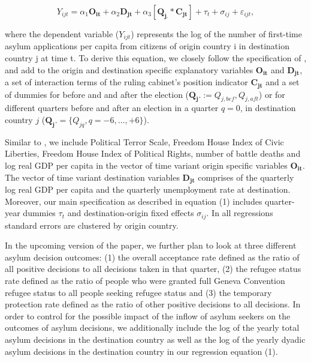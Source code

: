 \documentclass[a4paper,12pt]{article}
\begin{document}
\begin{equation}
Y_{ijt} =\alpha_1 \mathbf{O_{it}} + \alpha_2 \mathbf{D_{jt}} + \alpha_3 [\mathbf{Q_{j.}} *  \mathbf{C_{jt}}] + \tau_t + \sigma_{ij} +  \varepsilon_{ijt},
\end{equation}

where the dependent variable ($Y_{ijt}$) represents the log of the number of first-time asylum applications per capita from citizens of origin country i in destination country j at time t. To derive this equation, we closely follow the specification of \cite{hatton2016}, and add to the origin and destination specific explanatory variables $\mathbf{O_{it}}$ and $\mathbf{D_{jt}}$, a set of interaction terms of the ruling cabinet's position indicator $\mathbf{C_{jt}}$
 and  a set of dummies for before and and after the election ($\mathbf{Q_j.} := Q_{j,bef},  Q_{j,aft}$) or for different quarters before and after an election in a quarter $q=0$, in destination country $j$ ($\mathbf{Q_j.} =\{Q_{jq}, q = -6, \ldots, +6\}$).
 
  Similar to \cite{hatton2016}, we include Political Terror Scale, Freedom House Index of Civic Liberties, Freedom House Index of  Political Rights, number of battle deaths and log real GDP per capita in the vector of time variant origin specific variables $\mathbf{O_{it}}$. The vector of time variant destination variables $\mathbf{D_{jt}}$ comprises of the quarterly log real GDP per capita and the quarterly unemployment rate at destination. Moreover, our main specification as described in equation (1) includes quarter-year dummies $\tau_t$ and destination-origin fixed effects $\sigma_{ij}$. In all regressions standard errors are clustered by origin country.
 
 In the upcoming version of the paper, we further plan to look at three different asylum decision outcomes: (1) the overall acceptance rate defined as the ratio of all positive decisions to all decisions taken in that quarter, (2) the refugee status rate defined as the ratio of people who were granted full Geneva Convention refugee status to all people seeking refugee status and (3) the temporary protection rate defined as the ratio of other positive decisions to all decisions.  In order to control for the possible impact of the inflow of asylum seekers on the outcomes of asylum decisions, we additionally include  the log of the yearly total asylum decisions in the destination country as well as the log of  the yearly dyadic asylum decisions in the destination country in our regression equation (1). 
\end{document}
